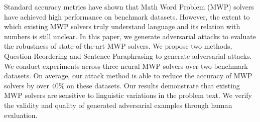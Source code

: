 Standard accuracy metrics have shown that Math Word Problem (MWP) solvers have achieved high performance on benchmark datasets. However, the extent to which existing MWP solvers truly understand language and its relation with numbers is still unclear.  In this paper, we generate adversarial attacks to evaluate the robustness of state-of-the-art MWP solvers. We propose two methods, Question Reordering and Sentence Paraphrasing to generate adversarial attacks. We conduct experiments across three neural MWP solvers over two benchmark datasets. On average, our attack method is able to reduce the accuracy of MWP solvers by over 40\% on these datasets. Our results demonstrate that existing MWP solvers are sensitive to linguistic variations in the problem text. We verify the validity and quality of generated adversarial examples through human evaluation.
